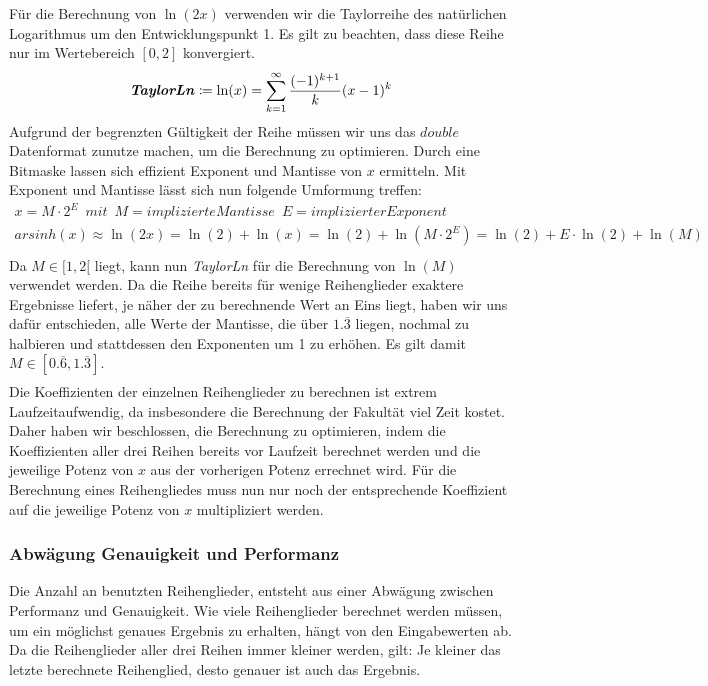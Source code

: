 \documentclass[course=erap] {aspdoc}
\begin{document}
    Für die Berechnung von $\ln(2x)$ verwenden wir die Taylorreihe des natürlichen Logarithmus um den Entwicklungspunkt 1. Es gilt zu beachten, dass diese Reihe nur im Wertebereich $[0, 2]$ konvergiert.
    \[
        \textbf{\textit{TaylorLn}}\coloneqq\ln(x) = \sum_{k = 1}^{\infty} \frac{(-1)^{k + 1}}{k}(x - 1)^k
    \]
    Aufgrund der begrenzten Gültigkeit der Reihe müssen wir uns das $double$ Datenformat zunutze machen, um die Berechnung zu optimieren. Durch eine Bitmaske lassen sich effizient Exponent und Mantisse von $x$ ermitteln. Mit Exponent und Mantisse lässt sich nun folgende Umformung treffen:
    \begin{gather*}
        x = M\cdot2^E \,\,\, mit \,\,\, M = implizierte Mantisse \,\,\, E = implizierter Exponent\\
        arsinh(x) \approx \ln(2x) = \ln(2) + \ln(x) = \ln(2) + \ln(M\cdot2^E) = \ln(2) + E\cdot\ln(2) + \ln(M)\\
    \end{gather*}
    Da $M\in[1, 2[$ liegt, kann nun \textit{TaylorLn} für die Berechnung von $\ln(M)$ verwendet werden. Da die Reihe bereits für wenige Reihenglieder exaktere Ergebnisse liefert, je näher der zu berechnende Wert an Eins liegt, haben wir uns dafür entschieden, alle Werte der Mantisse, die über $1.\overline{3}$ liegen, nochmal zu halbieren und stattdessen den Exponenten um 1 zu erhöhen. Es gilt damit $M\in[0.\overline{6}, 1.\overline{3}]$. 
    \begin{gather*}\end{gather*}
    Die Koeffizienten der einzelnen Reihenglieder zu berechnen ist extrem Laufzeitaufwendig, da insbesondere die Berechnung der Fakultät viel Zeit kostet. Daher haben wir beschlossen, die Berechnung zu optimieren, indem die Koeffizienten aller drei Reihen bereits vor Laufzeit berechnet werden und die jeweilige Potenz von $x$ aus der vorherigen Potenz errechnet wird. Für die Berechnung eines Reihengliedes muss nun nur noch der entsprechende Koeffizient auf die jeweilige Potenz von $x$ multipliziert werden. 
    

    \subsubsection{Abwägung Genauigkeit und Performanz}
    Die Anzahl an benutzten Reihenglieder, entsteht aus einer Abwägung zwischen Performanz und Genauigkeit.
    Wie viele Reihenglieder berechnet werden müssen, um ein möglichst genaues Ergebnis zu erhalten, hängt von den Eingabewerten ab. Da die Reihenglieder aller drei Reihen immer kleiner werden, gilt: Je kleiner das letzte berechnete Reihenglied, desto genauer ist auch das Ergebnis.
    
\end{document}
